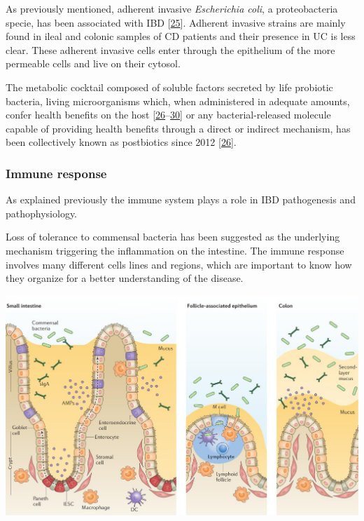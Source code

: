 \documentclass[
  12pt,
  a4paper,
  twoside,
  openright]{book}
\let\origfigure\figure
\let\endorigfigure\endfigure
\renewenvironment{figure}[1][2] {
    \expandafter\origfigure\expandafter[!ht]
} {
    \endorigfigure
}
\begin{document}
As previously mentioned, adherent invasive \emph{Escherichia coli}, a proteobacteria specie, has been associated with IBD {[}\protect\hyperlink{ref-darfeuille-michaud1998}{25}{]}.
Adherent invasive strains are mainly found in ileal and colonic samples of CD patients and their presence in UC is less clear.
These adherent invasive cells enter through the epithelium of the more permeable cells and live on their cytosol.

The metabolic cocktail composed of soluble factors secreted by life probiotic bacteria, living microorganisms which, when administered in adequate amounts, confer health benefits on the host {[}\protect\hyperlink{ref-tsilingiri2012}{26}--\protect\hyperlink{ref-morelli2012}{30}{]} or any bacterial-released molecule capable of providing health benefits through a direct or indirect mechanism, has been collectively known as postbiotics since 2012 {[}\protect\hyperlink{ref-tsilingiri2012}{26}{]}.

\hypertarget{immune-response}{%
\subsubsection{Immune response}\label{immune-response}}

As explained previously the immune system plays a role in IBD pathogenesis and pathophysiology.

Loss of tolerance to commensal bacteria has been suggested as the underlying mechanism triggering the inflammation on the intestine.
The immune response involves many different cells lines and regions, which are important to know how they organize for a better understanding of the disease.

\begin{figure}
\includegraphics[width=1\linewidth]{images/tesis_AC_FigureX} \caption{The intestinal epithelial barrier.}\label{fig:barrier}
\end{figure}
\end{document}
